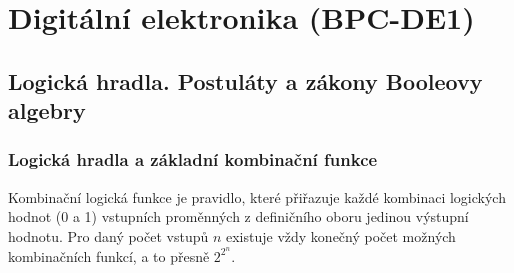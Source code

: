 \section{Digitální elektronika (BPC-DE1)}
\subsection{Logická hradla. Postuláty a zákony Booleovy algebry}
    \subsubsection{Logická hradla a základní kombinační funkce}
        Kombinační logická funkce je pravidlo, které přiřazuje každé kombinaci logických hodnot (0 a 1) vstupních proměnných z definičního oboru jedinou výstupní hodnotu. Pro daný počet vstupů $n$ existuje vždy konečný počet možných kombinačních funkcí, a to přesně $2^{2^n}$.
        
